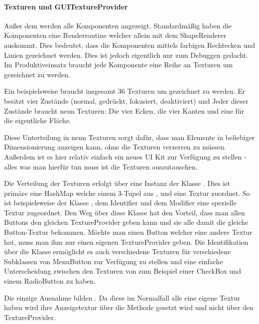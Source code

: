 \paragraph{Texturen und GUITextureProvider}

Außer dem  werden alle Komponenten angezeigt. Standardmäßig haben die Komponenten eine Renderroutine welcher allein mit dem ShapeRenderer auskommt. Dies bedeutet, dass die Komponenten mittels farbigen Rechtecken und Linien gezeichnet werden. Dies ist jedoch eigentlich nur zum Debuggen gedacht. Im Produktiveinsatz braucht jede Komponente eine Reihe an Texturen um gezeichnet zu werden.

Ein  beispielsweise braucht insgesamt 36 Texturen um gezeichnet zu werden. Er besitzt vier Zustände (normal, gedrückt, fokusiert, deaktiviert) und Jeder dieser Zustände braucht neun Texturen: Die vier Ecken, die vier Kanten und eine für die eigentliche Fläche.


Diese Unterteilung in neun Texturen sorgt dafür, dass man Elemente in beliebiger Dimensionierung anzeigen kann, ohne die Texturen verzerren zu müssen. Außerdem ist es hier relativ einfach ein neues UI Kit zur Verfügung zu stellen - alles was man hierfür tun muss ist die Texturen auszutauschen.

Die Verteilung der Texturen erfolgt über eine Instanz der Klasse . Dies ist primäre eine HashMap welche einem 3-Tupel aus ,  und  eine Textur zuordnet. So ist beispielsweise der Klasse , dem Identifier  und dem Modifier  eine spezielle Textur zugeordnet.
Den Weg über diese Klasse hat den Vorteil, dass man allen Buttons den gleichen TextureProvider geben kann und sie alle damit die gleiche Button-Textur bekommen. Möchte man einen Button welcher eine andere Textur hat, muss man ihm nur einen eigenen TextureProvider geben. Die Identifikation über die Klasse ermöglicht es auch verschiedene Texturen für verschiedene Subklassen von MenuButton zur Verfügung zu stellen und eine einfache Unterscheidung zwischen den Texturen von zum Beispiel einer CheckBox und einem RadioButton zu haben.

Die einzige Ausnahme bilden . Da diese im Normalfall alle eine eigene Textur haben wird ihre Anzeigetextur über die Methode  gesetzt wird und nicht über den TextureProvider.

